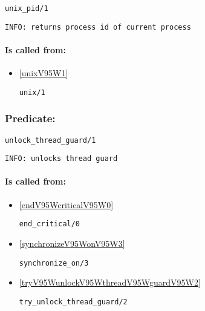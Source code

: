 \begin{verbatim}
unix_pid/1
\end{verbatim}

{\small \begin{verbatim}
INFO: returns process id of current process

\end{verbatim}}
\paragraph{Is called from:} 
\begin{itemize}
\item \ref{unixV95W1} 
\begin{verbatim}
unix/1
\end{verbatim}

\end{itemize}

\subsubsection{Predicate:} \label{unlockV95WthreadV95WguardV95W1}

\begin{verbatim}
unlock_thread_guard/1
\end{verbatim}

{\small \begin{verbatim}
INFO: unlocks thread guard

\end{verbatim}}
\paragraph{Is called from:} 
\begin{itemize}
\item \ref{endV95WcriticalV95W0} 
\begin{verbatim}
end_critical/0
\end{verbatim}

\item \ref{synchronizeV95WonV95W3} 
\begin{verbatim}
synchronize_on/3
\end{verbatim}

\item \ref{tryV95WunlockV95WthreadV95WguardV95W2} 
\begin{verbatim}
try_unlock_thread_guard/2
\end{verbatim}

\end{itemize}

